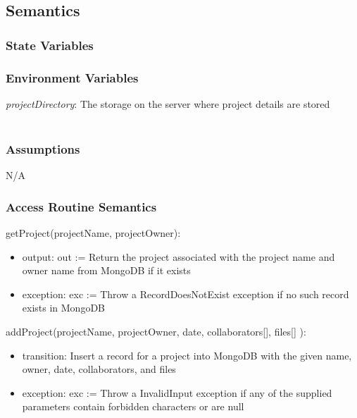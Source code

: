 \documentclass[12pt, titlepage]{article}
\begin{document}
	\subsection{Semantics}
	
	\subsubsection{State Variables}
	
	
	\subsubsection{Environment Variables}
	
	\textit{projectDirectory}: The storage on the server where project details are stored \\\\ 
	
	\subsubsection{Assumptions}
	N/A
	
	\subsubsection{Access Routine Semantics}
	
	\noindent getProject(projectName, projectOwner):
	\begin{itemize}
		\item output: out := Return the project associated with the project name and owner name from MongoDB if it exists
		
		\item exception: exc := Throw a RecordDoesNotExist exception if no such record exists in MongoDB
	\end{itemize}
	
	\noindent addProject(projectName, projectOwner, date, collaborators[], files[] ):
	\begin{itemize}
		\item transition: Insert a record for a project into MongoDB with the given name, owner, date, collaborators, and files
		
		\item exception: exc := Throw a InvalidInput exception if any of the supplied parameters contain forbidden characters or are null
	\end{itemize}
	
\end{document}
